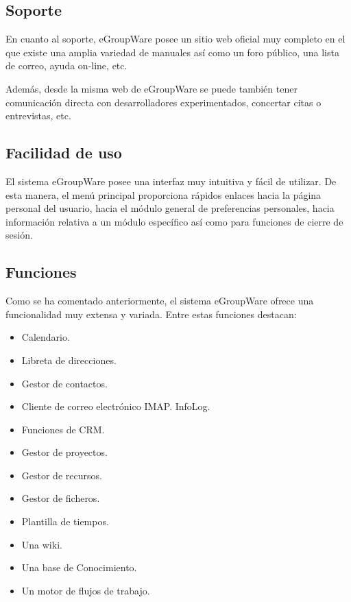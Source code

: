 \subsection{Soporte}

En cuanto al soporte, eGroupWare posee un sitio web oficial muy completo en el que existe una amplia variedad de manuales así como un foro público, una lista de correo, ayuda on-line, etc.

Además, desde la misma web de eGroupWare se puede también tener comunicación directa con desarrolladores experimentados, concertar citas o entrevistas, etc.

\subsection{Facilidad de uso}

El sistema eGroupWare posee una interfaz muy intuitiva y fácil de utilizar. De esta manera, el menú principal proporciona rápidos enlaces hacia la página personal del usuario, hacia el módulo general de preferencias personales, hacia información relativa a un módulo específico así como para funciones de cierre de sesión.

\subsection{Funciones}

Como se ha comentado anteriormente, el sistema eGroupWare ofrece una funcionalidad muy extensa y variada. Entre estas funciones destacan:

\begin{itemize}
	\item Calendario.
	\item Libreta de direcciones.
	\item Gestor de contactos.
	\item Cliente de correo electrónico IMAP. InfoLog.
	\item Funciones de CRM.
	\item Gestor de proyectos.
	\item Gestor de recursos.
	\item Gestor de ficheros.
	\item Plantilla de tiempos.
	\item Una wiki.
	\item Una base de Conocimiento.
	\item Un motor de flujos de trabajo.
\end{itemize}

